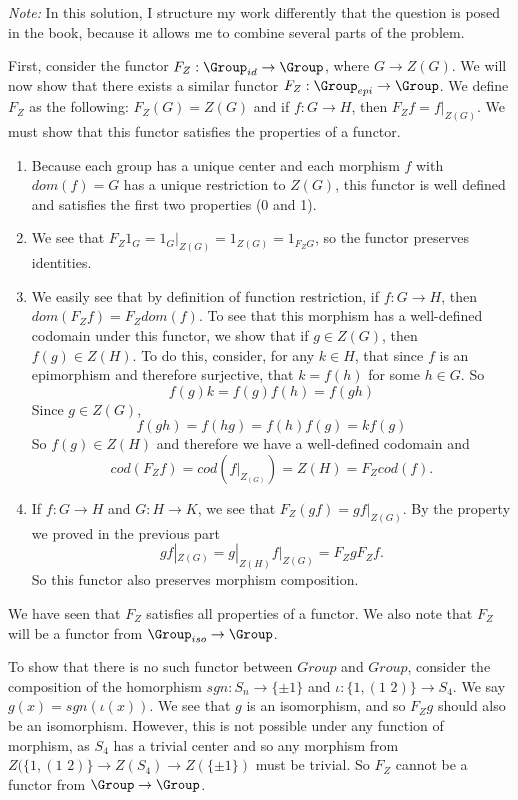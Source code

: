 \documentclass[main.tex]{subfiles}
\begin{document}
\textit{Note:} In this solution, I structure my work differently that the
question is posed in the book, because it allows me to combine several parts of
the problem.

First, consider the functor $F_Z: \Group_{id}\rightarrow \Group$, where $G
\rightarrow Z(G)$. We will now show that there exists a similar functor $F_Z:
\Group_{epi} \rightarrow \Group$. We define $F_Z$ as the following: $F_Z(G) =
Z(G)$ and if $f: G \rightarrow H$, then $F_{Z} f = f|_{Z(G)}$. We must show that
this functor satisfies the properties of a functor.
\begin{enumerate}
	\item Because each group has a unique center and each morphism $f$ with
		$dom(f) = G$ has a unique restriction to $Z(G)$, this functor is well
		defined and satisfies the first two properties (0 and 1).

	\item We see that $F_{Z} 1_{G} = 1_{G}|_{Z(G)} = 1_{Z(G)} = 1_{F_{Z}G}$, so
		the functor preserves identities.

	\item We easily see that by definition of function restriction, if $f: G
		\rightarrow H$, then $dom(F_{Z}f) = F_{Z}dom(f)$. To see that this
		morphism has a well-defined codomain under this functor, we show that if
		$g \in Z(G)$, then $f(g) \in Z(H)$. To do this, consider, for any $k \in
		H$, that since $f$ is an epimorphism and therefore surjective, that $k =
		f(h)$ for some $h \in G$. So \[f(g)k = f(g)f(h) = f(gh)\]Since $g \in
		Z(G)$, \[f(gh) = f(hg) = f(h)f(g) = kf(g)\] So $f(g) \in Z(H)$ and
		therefore we have a well-defined codomain and  \[cod(F_{Z}f) =
		cod(f|_{Z_(G)}) = Z(H) = F_{Z}cod(f).\]

	\item If $f:G \rightarrow H$ and $G: H \rightarrow K$, we see that $F_Z(gf)
		= gf|_{Z(G)}$. By the property we proved in the previous part
		\[gf|_{Z(G)} = g|_{Z(H)}f|_{Z(G)} = F_ZgF_Zf.\] So this functor also
		preserves morphism composition.
\end{enumerate}

We have seen that $F_Z$ satisfies all properties of a functor. We also note that
$F_Z$ will be a functor from $\Group_{iso} \rightarrow \Group$.

To show that there is no such functor between $Group$ and $Group$, consider the
composition of the homorphism $sgn: S_n \rightarrow \{ \pm 1 \} $ and $\iota:
\{1, (1 \,\, 2) \} \rightarrow S_4$. We say $ g(x) = sgn(\iota(x))$. We see that
$g$ is an isomorphism, and so $F_Zg$ should also be an isomorphism. However,
this is not possible under any function of morphism, as $S_4$ has a trivial
center and so any morphism from $Z(\{1, (1\,\,2)\} \rightarrow Z(S_4)
\rightarrow Z(\{\pm 1\})$ must be trivial. So $F_Z$ cannot be a functor from
$\Group \rightarrow \Group$.
\end{document}
